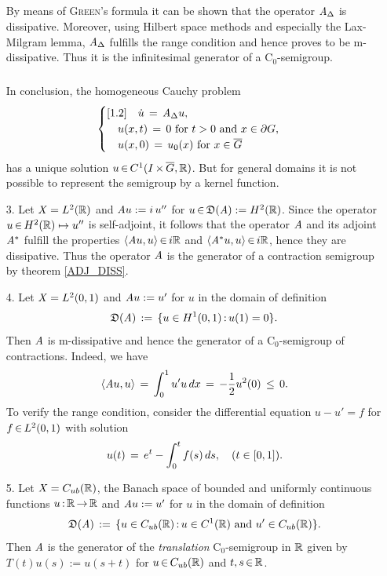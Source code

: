 \documentclass[11pt,twoside]{article}
\begin{document}
\begin{itemize}[leftmargin=12pt,itemsep=5pt]
\subparagraph{}
By means of \textsc{Green}'s formula it can be shown that
the operator $\linA_{\Delta}$ is dissipative.
Moreover,
using Hilbert space methods and especially the Lax-Milgram lemma,
$\linA_{\Delta}$ fulfills the range condition
and hence proves to be m-dissipative.
Thus it is the infinitesimal generator of a C$_0$-semigroup.

\subparagraph{}
In conclusion, 
the homogeneous Cauchy problem
\[
\begin{cases}[1.2]
\quad \dot{u} \= \linA_{\Delta} u,\\
\quad u(x,t)  \= 0      \for t > 0 \and x \in \bndG,\\
\quad u(x,0)  \= u_0(x) \for x \in \clG\\
\end{cases}
\]
has a unique solution $u \xeof C^1(\J \xtimes \clG,\R)$.
But for general domains it is not possible to represent the semigroup
by a kernel function.

\item[3.]
Let $\banX = L^2(\R)$ and $\linA u:= i\,u''$
for $u \xeof \domain{\linA} :=  H^2(\R)$.
Since the operator $u \xeof H^2(\R) \mapsto u''$ is self-adjoint,
it follows that the operator $\linA$ and its adjoint $\linA^*$ fulfill
the properties
$\scalar{\linA u}{u} \xeof i\R$ and $\scalar{\linA^* u}{u} \xeof i\R$,
hence they are dissipative.
Thus the operator $\linA$ is the generator of a contraction semigroup
by theorem \ref{ADJ_DISS}.

\item[4.]
Let $\banX = L^2(0,1)$ and $\linA u := u'$
for $u$ in the domain of definition
\[
\domain{\linA} \eqdef \{u \in H^1(0,1) \: u(1) = 0\}.
\]
Then $\linA$ is m-dissipative and hence the generator of a C$_0$-semigroup
of contractions.
Indeed, we have
\[
\scalar{\linA u}{u} \= \int_0^1 u' u \, dx \= - \frac{1}{2} u^2(0) \,\leq\, 0.
\]
To verify the range condition, consider the differential equation
$u -u' = f$ for $f \xeof L^2(0,1)$ with solution
\[
u(t) \= e^t - \int_0^t f(s)\,ds, \quad (t \in [0,1]).
\]

\item[5.]
Let $\banX = C_{ub}(\R)$,
the Banach space of bounded and uniformly continuous functions $u \:\R \xto \R$
and $\linA u := u'$ for $u$ in the domain of definition
\[
\domain{\linA} \eqdef
\{u \in C_{ub}(\R) \: u \in C^1(\R) \and u' \in C_{ub}(\R)\}.
\]
Then $\linA$ is the generator of the \textit{translation} C$_0$-semigroup
{\TG} in $\R$ given by $T(t)u(s) := u(s+t)$
for $u \xeof C_{ub}(\R)$ and $t,s \xeof \R$.


\end{itemize}
\end{document}
